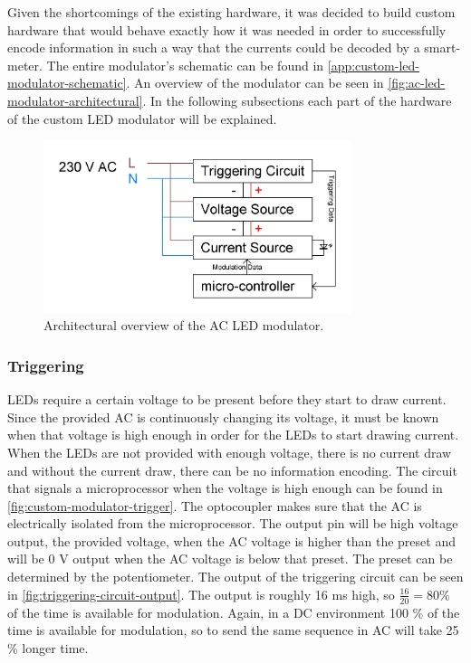 Given the shortcomings of the existing hardware, it was decided to build custom hardware that would behave exactly how it was needed in order to successfully encode information in such a way that the currents could be decoded by a smart-meter.
The entire modulator's schematic can be found in \autoref{app:custom-led-modulator-schematic}.
An overview of the modulator can be seen in \autoref{fig:ac-led-modulator-architectural}.
In the following subsections each part of the hardware of the custom LED modulator will be explained.


\begin{figure}[htb]
	\centering
	\includegraphics[angle=0,width=0.8\textwidth]{chapters/hardware-chapters/ac-modulator-architectural.JPG}
	\caption{Architectural overview of the AC LED modulator.}
	\label{fig:ac-led-modulator-architectural}
\end{figure}



	\subsubsection{Triggering}
	\label{subsubsec:triggering}

	LEDs require a certain voltage to be present before they start to draw current.
	Since the provided AC is continuously changing its voltage, it must be known when that voltage is high enough in order for the LEDs to start drawing current.
	When the LEDs are not provided with enough voltage, there is no current draw and without the current draw, there can be no information encoding.
	The circuit that signals a microprocessor when the voltage is high enough can be found in \autoref{fig:custom-modulator-trigger}.
	The optocoupler makes sure that the AC is electrically isolated from the microprocessor.
	The output pin will be high voltage output, the provided voltage, when the AC voltage is higher than the preset and will be 0 V output when the AC voltage is below that preset.
	The preset can be determined by the potentiometer.
	The output of the triggering circuit can be seen in \autoref{fig:triggering-circuit-output}.
	The output is roughly 16 ms high, so $\frac{16}{20} = 80 \%$ of the time is available for modulation.
	Again, in a DC environment 100 \% of the time is available for modulation, so to send the same sequence in AC will take 25 \% longer time.
	


